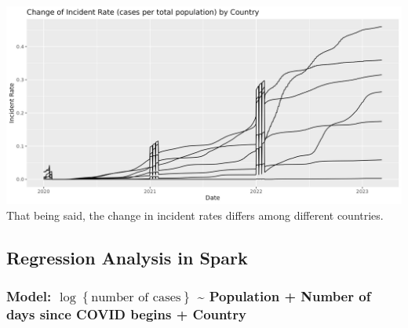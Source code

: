 \documentclass[
]{article}
\begin{document}
\includegraphics{./fig3.jpeg} That being said, the change in incident
rates differs among different countries.

\hypertarget{regression-analysis-in-spark}{%
\subsection{Regression Analysis in
Spark}\label{regression-analysis-in-spark}}

\hypertarget{model-logleft-textnumber-of-cases-right-population-number-of-days-since-covid-begins-country}{%
\subsubsection{\texorpdfstring{Model:
\(\log\left\{ \text{number of cases} \right\}\) \textasciitilde{}
Population + Number of days since COVID begins +
Country}{Model: \textbackslash log\textbackslash left\textbackslash\{ \textbackslash text\{number of cases\} \textbackslash right\textbackslash\} \textasciitilde{} Population + Number of days since COVID begins + Country}}\label{model-logleft-textnumber-of-cases-right-population-number-of-days-since-covid-begins-country}}
\end{document}
